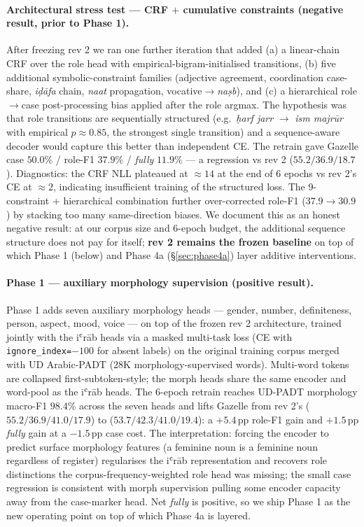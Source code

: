 \documentclass[10pt,a4paper,twocolumn]{article}
\begin{document}
\paragraph{Architectural stress test --- CRF $+$ cumulative constraints (negative result, prior to Phase 1).}
After freezing rev 2 we ran one further iteration that added (a) a linear-chain CRF over the role head with empirical-bigram-initialised transitions, (b) five additional symbolic-constraint families (adjective agreement, coordination case-share, \emph{i\d{d}\=afa} chain, \emph{naat} propagation, vocative$\rightarrow$\emph{na\d{s}b}), and (c) a hierarchical role$\rightarrow$case post-processing bias applied after the role argmax. The hypothesis was that role transitions are sequentially structured (e.g.\ \emph{\d{h}arf jarr} $\rightarrow$ \emph{ism majr\=ur} with empirical $p \approx 0.85$, the strongest single transition) and a sequence-aware decoder would capture this better than independent CE. The retrain gave Gazelle case $50.0\%$ / role-F1 $37.9\%$ / \emph{fully} $11.9\%$ --- a regression vs rev 2 ($55.2 / 36.9 / 18.7$). Diagnostics: the CRF NLL plateaued at ${\approx}14$ at the end of 6 epochs vs rev 2's CE at ${\approx}2$, indicating insufficient training of the structured loss. The 9-constraint + hierarchical combination further over-corrected role-F1 ($37.9 \to 30.9$) by stacking too many same-direction biases. We document this as an honest negative result: at our corpus size and 6-epoch budget, the additional sequence structure does not pay for itself; \textbf{rev 2 remains the frozen baseline} on top of which Phase 1 (below) and Phase 4a (\S\ref{sec:phase4a}) layer additive interventions.

\paragraph{Phase 1 --- auxiliary morphology supervision (positive result).}
\label{sec:phase1}
Phase 1 adds seven auxiliary morphology heads --- gender, number, definiteness, person, aspect, mood, voice --- on top of the frozen rev 2 architecture, trained jointly with the iʿrāb heads via a masked multi-task loss (CE with \texttt{ignore\_index=$-100$} for absent labels) on the original training corpus merged with UD Arabic-PADT (28K morphology-supervised words). Multi-word tokens are collapsed first-subtoken-style; the morph heads share the same encoder and word-pool as the iʿrāb heads. The 6-epoch retrain reaches UD-PADT morphology macro-F1 $98.4\%$ across the seven heads and lifts Gazelle from rev 2's ($55.2 / 36.9 / 41.0 / 17.9$) to ($53.7 / \mathbf{42.3} / 41.0 / \mathbf{19.4}$): a $+5.4$\,pp role-F1 gain and $+1.5$\,pp \emph{fully} gain at a $-1.5$\,pp case cost. The interpretation: forcing the encoder to predict surface morphology features (a feminine noun is a feminine noun regardless of register) regularises the iʿrāb representation and recovers role distinctions the corpus-frequency-weighted role head was missing; the small case regression is consistent with morph supervision pulling some encoder capacity away from the case-marker head. Net \emph{fully} is positive, so we ship Phase 1 as the new operating point on top of which Phase 4a is layered.
\end{document}
